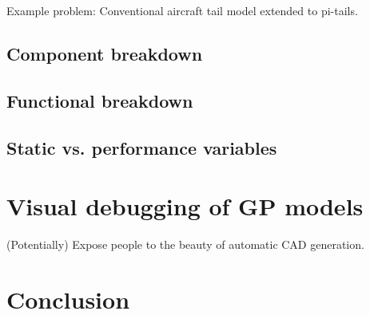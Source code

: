 \documentclass{aiaa-pretty}
\begin{document}
Example problem: Conventional aircraft tail model extended to pi-tails. 

\subsection{Component breakdown}

\subsection{Functional breakdown}

\subsection{Static vs. performance variables}

\section{Visual debugging of \gls{GP} models}

(Potentially) Expose people to the beauty of automatic CAD generation. 

\section{Conclusion}
\end{document}
